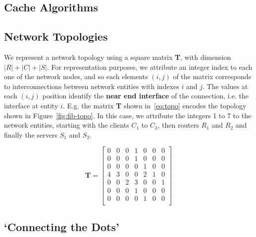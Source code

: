 \subsection{Cache Algorithms}
\label{subsec:meth-caching-algs}

\subsection{Network Topologies}
\label{subsec:meth-topologies}

We represent a network topology using a square matrix \textbf{T}, 
with dimension $|R|+|C|+|S|$. For representation purposes, we attribute an 
integer index to each one of the network nodes, and so each elements $(i,j)$ of the 
matrix corresponds to interconnections between network entities with indexes $i$ and $j$. The 
values at each $(i,j)$ position identify the \textbf{near end interface} of the 
connection, i.e. the interface at entity $i$. E.g. the matrix \textbf{T} shown 
in~\ref{eq:topo} encodes the topology shown in Figure~\ref{fig:fib-topo}. In this case, 
we attribute the integers 1 to 7 to the network entities, starting with the 
clients $C_1$ to $C_3$, then routers $R_1$ and $R_2$ and 
finally the servers $S_1$ and $S_2$.

\begin{equation}
\textbf{T} = \begin{bmatrix} 
                0 & 0 & 0 & 1 & 0 & 0 & 0               \\ 
                0 & 0 & 0 & 1 & 0 & 0 & 0               \\ 
                0 & 0 & 0 & 0 & 1 & 0 & 0               \\ 
                4 & 3 & 0 & 0 & 2 & 1 & 0               \\ 
                0 & 0 & 2 & 3 & 0 & 0 & 1               \\ 
                0 & 0 & 0 & 1 & 0 & 0 & 0               \\ 
                0 & 0 & 0 & 0 & 1 & 0 & 0               \\ \end{bmatrix}
    \label{eq:topo}
\end{equation}\shortvertbreak

\subsection{`Connecting the Dots'}
\label{subsec:meth-conn-dots}



